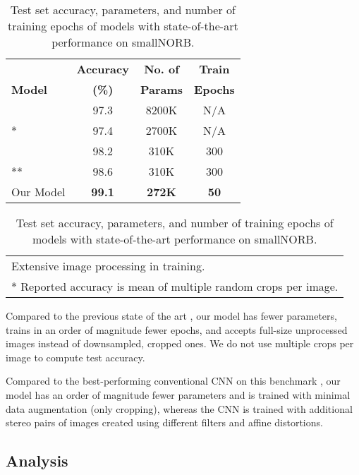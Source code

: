 \documentclass[11pt,a4paper]{article}
\begin{document}
\begin{table}[h]
	\small
	\begin{center}
		\begin{tabular}{@{}lccc@{}}
			\toprule
			\bf &  \bf Accuracy &\bf No. of & \bf Train\\
			\bf Model & \bf (\%) & \bf Params & \bf Epochs \\
			\midrule
			\citet{DBLP:journals/corr/abs-1710-09829} & 97.3 & 8200K & N/A \\
			\citet{DBLP:journals/corr/abs-1102-0183}* & 97.4 & 2700K & N/A \\
			\citet{46653} & 98.2 & 310K & 300 \\
			\citet{46653}** & 98.6 & 310K & 300 \\
			Our Model & \bf 99.1 & \bf 272K & \bf 50 \\
			\bottomrule
		\end{tabular}
	\end{center}
	\begin{tabular}{l}
		\scriptsize * Extensive image processing in training. \\
		\scriptsize ** Reported accuracy is mean of multiple random crops per image. \\
	\end{tabular}
	\caption{\label{table:smallnorb}Test set accuracy, parameters, and number of training epochs of models with state-of-the-art performance on smallNORB.}
\end{table}

Compared to the previous state of the art \cite{46653}, our model has fewer parameters, trains in an order of magnitude fewer epochs, and accepts full-size unprocessed images instead of downsampled, cropped ones. We do not use multiple crops per image to compute test accuracy.

Compared to the best-performing conventional CNN on this benchmark \cite{DBLP:journals/corr/abs-1102-0183}, our model has an order of magnitude fewer parameters and is trained with minimal data augmentation (only cropping), whereas the CNN is trained with additional stereo pairs of images created using different filters and affine distortions.


\subsection{Analysis}
\end{document}
